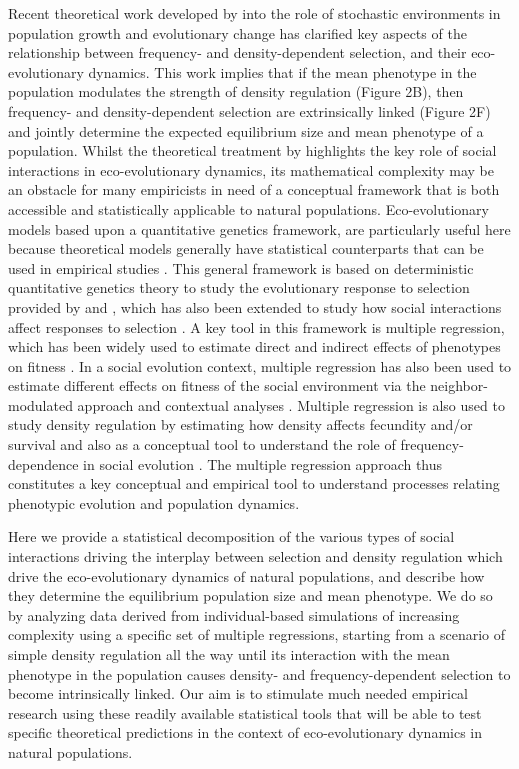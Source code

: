 \documentclass{article}
\begin{document}
 Recent theoretical work developed by \citet{Engen2020} into the role of stochastic environments in population growth and evolutionary change has clarified key aspects of the relationship between frequency- and density-dependent selection, and their eco-evolutionary dynamics. This work implies that if the mean phenotype in the population modulates the strength of density regulation (Figure 2B), then frequency- and density-dependent selection are extrinsically linked (Figure 2F) and jointly determine the expected equilibrium size and mean phenotype of a population. Whilst the theoretical treatment by \citet{Engen2020} highlights the key role of social interactions in eco-evolutionary dynamics, its mathematical complexity may be an obstacle for many empiricists in need of a conceptual framework that is both accessible and statistically applicable to natural populations. Eco-evolutionary models based upon a quantitative genetics framework, are particularly useful here because theoretical models generally have statistical counterparts that can be used in empirical studies  \citep{Lande1983, Robertson1966}. This general framework is based on deterministic quantitative genetics theory to study the evolutionary response to selection provided by \cite{Lande1976, Lande1979} and \cite{Lande1983}, which has also been extended to study how social interactions affect responses to selection \citep{Queller1985a, Wolf1999SocialSelection, McGlothlin2010}. A key tool in this framework is multiple regression, which has been widely used to estimate direct and indirect effects of phenotypes on fitness \citep{Kingsolver2011}. In a social evolution context, multiple regression has also been used to estimate different effects on fitness of the social environment via the neighbor-modulated approach and contextual analyses \citep{Heisler1987, Okasha2006}. Multiple regression is also used to study density regulation by estimating how density affects fecundity and/or survival \citep{Araya-Ajoy2021, Saether2021} and also as a conceptual tool to understand the role of frequency-dependence in social evolution \citep{Araya-Ajoy2020, Westneat2012a}. The multiple regression approach thus constitutes a key conceptual and empirical tool to understand processes relating phenotypic evolution and population dynamics. 

Here we provide a statistical decomposition of the various types of social interactions driving the interplay between selection and density regulation which drive the eco-evolutionary dynamics of natural populations, and describe how they determine the equilibrium population size and mean phenotype. We do so by analyzing data derived from individual-based simulations of increasing complexity using a specific set of multiple regressions, starting from a scenario of simple density regulation all the way until its interaction with the mean phenotype in the population causes density- and frequency-dependent selection to become intrinsically linked. Our aim is to stimulate much needed empirical research using these readily available statistical tools that will be able to test specific theoretical predictions in the context of eco-evolutionary dynamics in natural populations.
\end{document}
